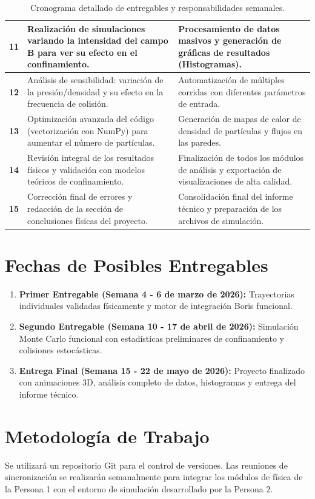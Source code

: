 \documentclass[11pt]{article}
\begin{document}
\begin{table}[H]
\begin{tabularx}{\textwidth}{|@{}c|X|X|@{}}
\textbf{11} & Realización de simulaciones variando la intensidad del campo B para ver su efecto en el confinamiento. & Procesamiento de datos masivos y generación de gráficas de resultados (Histogramas). \\ \midrule
\textbf{12} & Análisis de sensibilidad: variación de la presión/densidad y su efecto en la frecuencia de colisión. & Automatización de múltiples corridas con diferentes parámetros de entrada. \\ \midrule
\textbf{13} & Optimización avanzada del código (vectorización con NumPy) para aumentar el número de partículas. & Generación de mapas de calor de densidad de partículas y flujos en las paredes. \\ \midrule
\textbf{14} & Revisión integral de los resultados físicos y validación con modelos teóricos de confinamiento. & Finalización de todos los módulos de análisis y exportación de visualizaciones de alta calidad. \\ \midrule
\textbf{15} & Corrección final de errores y redacción de la sección de conclusiones físicas del proyecto. & Consolidación final del informe técnico y preparación de los archivos de simulación. \\ \bottomrule
\end{tabularx}
\caption{Cronograma detallado de entregables y responsabilidades semanales.}
\end{table}

\section{Fechas de Posibles Entregables}
\begin{enumerate}
    \item \textbf{Primer Entregable (Semana 4 - 6 de marzo de 2026):} Trayectorias individuales validadas físicamente y motor de integración Boris funcional.
    \item \textbf{Segundo Entregable (Semana 10 - 17 de abril de 2026):} Simulación Monte Carlo funcional con estadísticas preliminares de confinamiento y colisiones estocásticas.
    \item \textbf{Entrega Final (Semana 15 - 22 de mayo de 2026):} Proyecto finalizado con animaciones 3D, análisis completo de datos, histogramas y entrega del informe técnico.
\end{enumerate}

\section{Metodología de Trabajo}
Se utilizará un repositorio Git para el control de versiones. Las reuniones de sincronización se realizarán semanalmente para integrar los módulos de física de la Persona 1 con el entorno de simulación desarrollado por la Persona 2.
\end{document}

